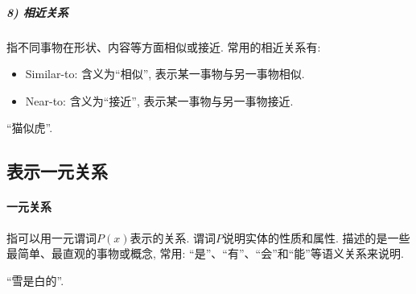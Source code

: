 \subparagraph{8) 相近关系}
指不同事物在形状、内容等方面相似或接近. 常用的相近关系有:
\begin{itemize}
\item Similar-to: 含义为“相似”, 表示某一事物与另一事物相似.
\item Near-to: 含义为“接近”, 表示某一事物与另一事物接近.
\end{itemize}
\begin{example}“猫似虎”.
\begin{figure}[H]
\begin{center}
\end{center}
\end{figure}
\end{example}
\subsection{表示一元关系}
\paragraph{一元关系}
指可以用一元谓词$P(x)$表示的关系. 谓词$P$说明实体的性质和属性.
描述的是一些最简单、最直观的事物或概念, 常用: “是”、“有”、“会”和“能”等语义关系来说明.
\begin{example}
    “雪是白的”.
\end{example}

